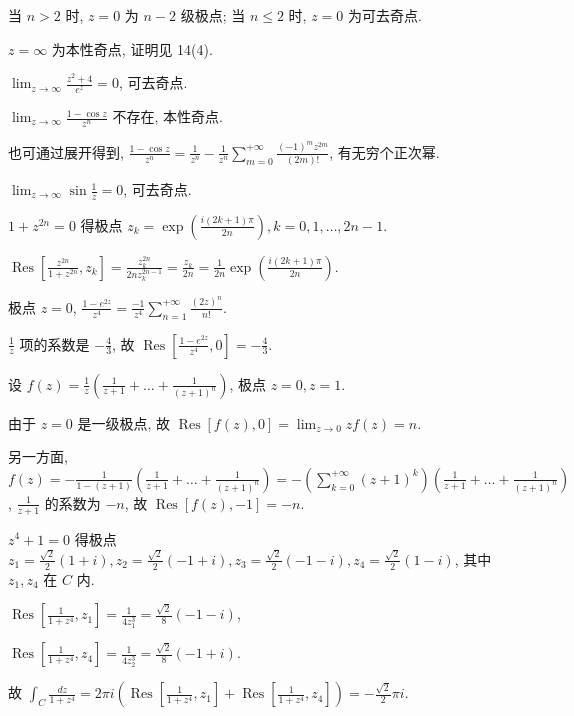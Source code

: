 \documentclass{homework}
\DeclareMathOperator\Res{Res}
\begin{document}
当 \(n>2\) 时, \(z=0\) 为 \(n-2\) 级极点;
当 \(n\leq2\) 时, \(z=0\) 为可去奇点.

\(z=\infty\) 为本性奇点, 证明见 14(4).

\(\lim_{z\to\infty}\frac{z^2+4}{e^z}=0\), 可去奇点.

\(\lim_{z\to\infty}\frac{1-\cos z}{z^n}\) 不存在, 本性奇点.

也可通过展开得到, \(\frac{1-\cos z}{z^n}=\frac{1}{z^n}-\frac{1}{z^n}\sum_{m=0}^{+\infty}\frac{(-1)^mz^{2m}}{(2m)!}\), 有无穷个正次幂.

\(\lim_{z\to\infty}\sin\frac{1}{z}=0\), 可去奇点.

\begin{center}
\end{center}

\(1+z^{2n}=0\) 得极点 \(z_k=\exp(\frac{i(2k+1)\pi}{2n}), k=0,1,\dots,2n-1\).

\(\Res[\frac{z^{2n}}{1+z^{2n}}, z_k]=\frac{z_k^{2n}}{2nz_k^{2n-1}}=\frac{z_k}{2n}=\frac{1}{2n}\exp(\frac{i(2k+1)\pi}{2n})\).

极点 \(z=0\), \(\frac{1-e^{2z}}{z^4}=\frac{-1}{z^4}\sum_{n=1}^{+\infty}\frac{(2z)^n}{n!}\).

\(\frac{1}{z}\) 项的系数是 \(-\frac{4}{3}\), 故 \(\Res[\frac{1-e^{2z}}{z^4}, 0]=-\frac{4}{3}\).

设 \(f(z)=\frac{1}{z}(\frac{1}{z+1}+\dots+\frac{1}{(z+1)^n})\), 极点 \(z=0, z=1\).

由于 \(z=0\) 是一级极点, 故 \(\Res[f(z), 0]=\lim_{z\to0}zf(z)=n\).

另一方面, \(f(z)=-\frac{1}{1-(z+1)}(\frac{1}{z+1}+\dots+\frac{1}{(z+1)^n})=-(\sum_{k=0}^{+\infty}(z+1)^k)(\frac{1}{z+1}+\dots+\frac{1}{(z+1)^n})\), \(\frac{1}{z+1}\) 的系数为 \(-n\), 故 \(\Res[f(z), -1]=-n\).

\(z^4+1=0\) 得极点 \(z_1=\frac{\sqrt{2}}{2}(1+i), z_2=\frac{\sqrt{2}}{2}(-1+i), z_3=\frac{\sqrt{2}}{2}(-1-i), z_4=\frac{\sqrt{2}}{2}(1-i)\), 其中 \(z_1, z_4\) 在 \(C\) 内.

\(\Res[\frac{1}{1+z^4}, z_1]=\frac{1}{4z_1^3}=\frac{\sqrt{2}}{8}(-1-i)\),

\(\Res[\frac{1}{1+z^4}, z_4]=\frac{1}{4z_2^3}=\frac{\sqrt{2}}{8}(-1+i)\).

故 \(\int_C\frac{dz}{1+z^4}=2\pi i(\Res[\frac{1}{1+z^4}, z_1]+\Res[\frac{1}{1+z^4}, z_4])=-\frac{\sqrt{2}}{2}\pi i\).
\end{document}
